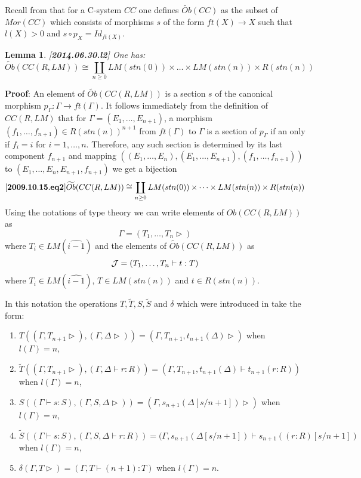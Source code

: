 \documentclass[11pt]{article}
\newenvironment{eq}{\begin{equation}}{\end{equation}}
\newenvironment{proof}{{\bf Proof}:}{\vskip 5mm }
\newtheorem{lemma}[proposition]{Lemma}
\newcommand{\llabel}[1]{\label{#1}[{\bf #1}]}
\newcommand{\sr}{\rightarrow}
\newcommand{\wt}{\widetilde}
\newcommand{\wh}{\widehat}
\begin{document}
Recall from \cite{Csubsystems} that for a C-system $CC$ one defines $\wt{Ob}(CC)$ as the subset of $Mor(CC)$ which consists of morphisms $s$ of the form $ft(X)\sr X$ such that $l(X)>0$ and $s\circ p_X=Id_{ft(X)}$. 
%
\begin{lemma}
\llabel{2014.06.30.l2}
One has:
%
$$\wt{Ob}(CC(R,LM))\cong \coprod_{n\ge 0} LM({stn(0)})\times\dots\times LM({stn(n)})\times R({stn(n)})$$
\end{lemma}
%
\begin{proof}
An element of $\wt{Ob}(CC(R,LM))$ is a section $s$ of the canonical morphism $p_{\Gamma}:\Gamma\sr ft(\Gamma)$. It follows immediately from the definition of $CC(R,LM)$ that for $\Gamma=(E_1,\dots,E_{n+1})$, a morphism $(f_1,\dots,f_{n+1})\in R({stn(n)})^{n+1}$ from $ft(\Gamma)$ to $\Gamma$ is a section of $p_{\Gamma}$ if an only if $f_i=i$ for $i=1,\dots,n$. Therefore, any such section is determined by its last component $f_{n+1}$ and mapping
$((E_1,\dots,E_n), (E_1,\dots,E_{n+1}), (f_1,\dots,f_{n+1}))$ to $(E_1,\dots,E_n,E_{n+1},f_{n+1})$ we get a bijection
%
\begin{eq}
\llabel{2009.10.15.eq2}
\wt{Ob}(CC(R,LM))\cong \coprod_{n\ge 0} LM({stn(0)})\times\dots\times LM({stn(n)})\times R({stn(n)})
\end{eq}
%
\end{proof}
%
Using the notations of type theory we can write elements of $Ob(CC(R,LM))$ as 
%
$$\Gamma=(T_1,\dots,T_n\rhd)$$
%
where $T_i\in LM(\wh{i-1})$ and the elements of $\wt{Ob}(CC(R,LM))$ as 
%
$${\cal J} = (T_1,\dots,T_n\vdash t:T)$$
%
where $T_i\in LM(\wh{i-1})$, $T\in LM({stn(n)})$ and $t\in R({stn(n)})$.

In this notation the operations $T,\wt{T},S,\wt{S}$ and $\delta$ which were introduced in \cite{Csubsystems} take the form:
%
\begin{enumerate}
\item $T((\Gamma,T_{n+1}\rhd),(\Gamma,\Delta\rhd))=(\Gamma,T_{n+1},t_{n+1}(\Delta)\rhd)$ when $l(\Gamma)=n$,
\item $\wt{T}((\Gamma,T_{n+1}\rhd),(\Gamma,\Delta\vdash r:R))=(\Gamma,T_{n+1},t_{n+1}(\Delta)\vdash t_{n+1}(r:R))$ when $l(\Gamma)=n$,
\item $S((\Gamma\vdash s:S),(\Gamma,S,\Delta\rhd))=(\Gamma,s_{n+1}(\Delta[s/n+1])\rhd)$ when $l(\Gamma)=n$,
\item $\wt{S}((\Gamma\vdash s:S),(\Gamma,S,\Delta\vdash r:R))=(\Gamma,s_{n+1}(\Delta[s/n+1])\vdash s_{n+1}((r:R)[s/n+1])$ when $l(\Gamma)=n$,
\item $\delta(\Gamma,T\rhd)=(\Gamma,T\vdash (n+1):T)$ when $l(\Gamma)=n$.
\end{enumerate}
%
\end{document}
